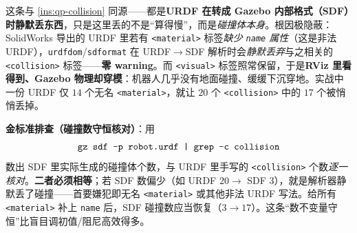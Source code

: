 \begin{pitfall}\label{pit:qp-urdf-sdf}
这条与 \cref{ins:qp-collision} 同源——都是\textbf{URDF 在转成 Gazebo 内部格式（SDF）时静默丢东西}，只是这里丢的不是“算得慢”，而是\emph{碰撞体本身}。根因极隐蔽：SolidWorks 导出的 URDF 里若有 \texttt{<material>} 标签\emph{缺少 \texttt{name} 属性}（这是非法 URDF），\texttt{urdfdom}/\allowbreak\texttt{sdformat} 在 URDF$\to$SDF 解析时会\emph{静默丢弃}与之相关的 \texttt{<collision>} 标签——\textbf{零 warning}。而 \texttt{<visual>} 标签照常保留，于是\textbf{RViz 里看得到、Gazebo 物理却穿模}：机器人几乎没有地面碰撞、缓缓下沉穿地。实战中一份 URDF 仅 $14$ 个无名 \texttt{<material>}，就让 $20$ 个 \texttt{<collision>} 中的 $17$ 个被悄悄丢掉\cite{sleiman2021unified}。

\noindent\textbf{金标准排查（碰撞数守恒核对）}：用
\begin{equation*}
  \texttt{gz sdf -p robot.\allowbreak urdf | grep -c collision}
\end{equation*}
数出 SDF 里实际生成的碰撞体个数，与 URDF 里手写的 \texttt{<collision>} 个数\emph{逐一核对}。\textbf{二者必须相等}；若 SDF 数偏少（如 URDF $20\to$ SDF $3$），就是解析器静默丢了碰撞——首要嫌犯即无名 \texttt{<material>} 或其他非法 URDF 写法。给所有 \texttt{<material>} 补上 \texttt{name} 后，SDF 碰撞数应当恢复（$3\to17$）。这条“数不变量守恒”比盲目调初值/阻尼高效得多。
\end{pitfall}

